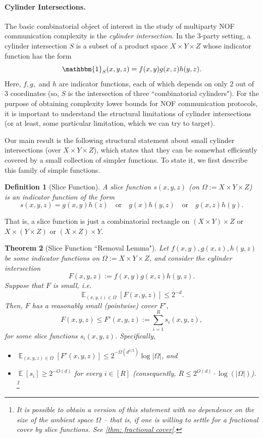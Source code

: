 \documentclass[11pt]{article}
\newtheorem{theorem}{Theorem}[section]
\newtheorem{definition}[theorem]{Definition}
\DeclareMathOperator*{\E}{\mathbb{E}}
\newcommand{\1}{ \mathbbm{1}}
\begin{document}
\paragraph{Cylinder Intersections.}
The basic combinatorial object of interest in the study of multiparty NOF communication complexity is the \emph{cylinder intersection}. 
In the $3$-party setting, a cylinder intersection $S$ is a subset of a product space $X \times Y \times Z$ 
whose indicator function has the form
$$ \1_{S}(x,y,z) = f(x,y)g(x,z)h(y,z). $$
Here, $f,g,$ and $h$ are indicator functions, each of which depends on only $2$ out of $3$ coordinates (so, $S$ is the intersection of three ``combinatorial cylinders"). 
For the purpose of obtaining complexity lower bounds for NOF communication protocols, 
it is important to understand the structural limitations of cylinder intersections (or at least, some particular limitation, which we can try to target). 

Our main result is the following structural statement about small cylinder intersections (over $X \times Y \times Z$), which states that they can be somewhat efficiently covered by a small collection of simpler functions. To state it, we first describe this family of simple functions. 

\begin{definition}[Slice Function]
    A slice function $s(x,y,z)$  (on $\Omega := X \times Y \times Z$) is an indicator function of the form
    $$ s(x,y,z) = g(x,y)h(z) \quad \text{or} \quad g(x)h(y,z) \quad \text{or} \quad g(x,z)h(y).$$ 
\end{definition}

That is, a slice function is just a combinatorial rectangle on $(X \times Y) \times Z$ or $X \times (Y \times Z)$ or $(X \times Z) \times Y$.

\begin{theorem}[Slice Function ``Removal Lemma"]\label{thm: removal lemma}
Let $f(x,y),g(x,z),h(y,z)$ be some indicator functions on $\Omega := X \times Y \times Z$, and consider the cylinder intersection
$$ F(x,y,z) := f(x,y)g(x,z)h(y,z). $$
Suppose that $F$ is small, i.e.\
$$ \E_{(x,y,z) \in \Omega}[F(x,y,z)] \leq 2^{-d}. $$
Then, $F$ has a reasonably small (pointwise) cover $F'$,
$$ F(x,y,z) \leq F'(x,y,z) := \sum_{i=1}^{R} s_i(x,y,z), $$
for some slice functions $s_i(x,y,z)$. Specifically,
\begin{itemize}
    \item $\E_{(x,y,z) \in \Omega}[F'(x,y,z)] \leq 2^{-\Omega(d^{1/2})}\log|\Omega|$, and
    \item $\E[s_i]\ge 2^{-O(d)}$ for every $i\in [R]$ (consequently, $R \le 2^{O(d)}\cdot \log(|\Omega|)$). \footnote{It is possible to obtain a version of this statement with no dependence on the size of the ambient space $\Omega$ -- that is, if one is willing to settle for a \emph{fractional} cover by slice functions. See \cref{thm: fractional cover}.}
\end{itemize}
\end{theorem}
\end{document}
